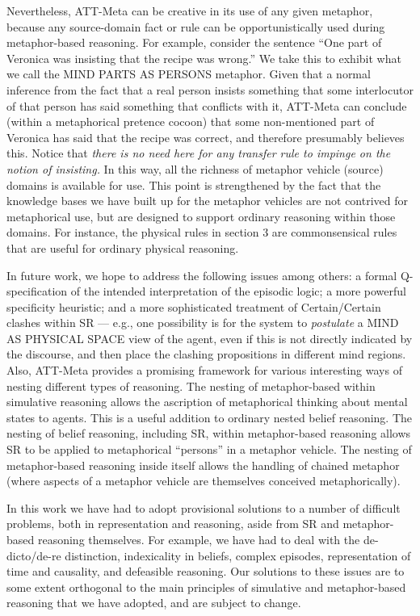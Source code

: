 Nevertheless, ATT-Meta can be creative in its use of any given metaphor,
because any source-domain fact or rule can be opportunistically used during
metaphor-based reasoning. For example, consider the sentence ``One part of
Veronica was insisting that the recipe was wrong.'' We take this to exhibit
what we call the MIND PARTS AS PERSONS metaphor.  Given that a normal inference
from the fact that a real person insists something that some interlocutor of
that person has said something that conflicts with it, ATT-Meta can conclude
(within a metaphorical pretence cocoon) that some non-mentioned part of
Veronica has said that the recipe was correct, and therefore presumably
believes this. Notice that {\it there is no need here for any transfer rule to
impinge on the notion of insisting.} In this way, all the richness of metaphor
vehicle (source) domains is available for use.  This point is strengthened by
the fact that the knowledge bases we have built up for the metaphor vehicles
are not contrived for metaphorical use, but are designed to support ordinary
reasoning within those domains. For instance, the physical rules in section 3
are commonsensical rules that are useful for ordinary physical reasoning.


In future work, we hope to address the following issues among others:
%
a formal Q-specification of the intended interpretation of the episodic logic;
%
a more powerful  specificity heuristic;
%
and
%
a more sophisticated treatment of Certain/Certain clashes within SR --- e.g.,
one possibility is for the system to {\it postulate} a MIND AS PHYSICAL SPACE
view of the agent, even if this is not directly indicated by the discourse, and
then place the clashing propositions in different mind regions.  Also, ATT-Meta
provides a promising framework for various interesting ways of nesting
different types of reasoning.  The nesting of metaphor-based within simulative
reasoning allows the ascription of metaphorical thinking about mental states to
agents. This is a useful addition to ordinary nested belief reasoning. The
nesting of belief reasoning, including SR, within metaphor-based reasoning
allows SR to be applied to metaphorical ``persons'' in a metaphor vehicle. The
nesting of metaphor-based reasoning inside itself allows the handling of
chained metaphor (where aspects of a metaphor vehicle are themselves conceived
metaphorically).

In this work we have had to adopt provisional solutions to a number of
difficult problems, both in representation and reasoning, aside from SR and
metaphor-based reasoning themselves. For example, we have had to deal with the
de-dicto/de-re distinction, indexicality in beliefs, complex episodes,
representation of time and causality, and defeasible reasoning.  Our solutions
to these issues are to some extent orthogonal to the main principles of
simulative and metaphor-based reasoning that we have adopted, and are subject
to change.



